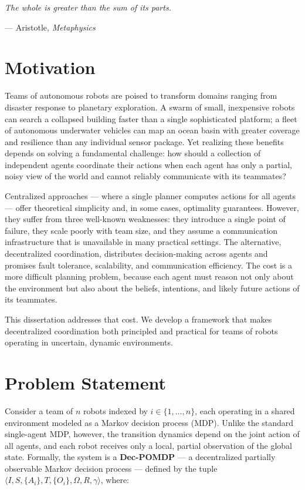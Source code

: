 \documentclass[12pt,oneside]{report}
\theoremstyle{definition}
\theoremstyle{remark}
\begin{document}
\epigraph{\itshape The whole is greater than the sum of its parts.}{--- Aristotle, \textit{Metaphysics}}

\section{Motivation}

Teams of autonomous robots are poised to transform domains ranging from disaster
response to planetary exploration. A swarm of small, inexpensive robots can search
a collapsed building faster than a single sophisticated platform; a fleet of autonomous
underwater vehicles can map an ocean basin with greater coverage and resilience
than any individual sensor package. Yet realizing these benefits depends on solving
a fundamental challenge: how should a collection of independent agents coordinate
their actions when each agent has only a partial, noisy view of the world and
cannot reliably communicate with its teammates?

Centralized approaches --- where a single planner computes actions for all agents ---
offer theoretical simplicity and, in some cases, optimality guarantees. However,
they suffer from three well-known weaknesses: they introduce a single point of
failure, they scale poorly with team size, and they assume a communication
infrastructure that is unavailable in many practical settings. The alternative,
decentralized coordination, distributes decision-making across agents and promises
fault tolerance, scalability, and communication efficiency. The cost is a more
difficult planning problem, because each agent must reason not only about the
environment but also about the beliefs, intentions, and likely future actions of
its teammates.

This dissertation addresses that cost. We develop a framework that makes
decentralized coordination both principled and practical for teams of robots
operating in uncertain, dynamic environments.

\section{Problem Statement}

Consider a team of $n$ robots indexed by $i \in \{1, \ldots, n\}$, each operating
in a shared environment modeled as a Markov decision process (MDP). Unlike the
standard single-agent MDP, however, the transition dynamics depend on the joint
action of all agents, and each robot receives only a local, partial observation
of the global state. Formally, the system is a \textbf{Dec-POMDP} --- a
decentralized partially observable Markov decision process --- defined by the tuple
$\langle I, S, \{A_i\}, T, \{O_i\}, \Omega, R, \gamma \rangle$, where:
\end{document}
